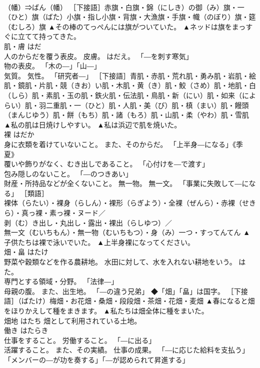 \documentclass[8pt]{extreport}
\begin{document}
\begin{CJK}{UTF8}{min}
\\	（幡）⇒ばん（幡） ［下接語］赤旗・白旗・錦（にしき）の御（み）旗・一（ひと）旗（ばた）小旗・指し小旗・背旗・大漁旗・手旗・幟（のぼり）旗・筵（むしろ）旗	▲その棒のてっぺんには旗がついていた。 ▲ネッドは旗をまっすぐに立てて持ってきた。
\\	肌・膚	はだ	
\\	人のからだを覆う表皮。 皮膚。 はだえ。 「―を刺す寒気」 
\\	物の表皮。 「木の―」「山―」 
\\	気質。 気性。 「研究者―」 ［下接語］青肌・赤肌・荒れ肌・勇み肌・岩肌・絵肌・鏡肌・片肌・競（きお）い肌・木肌・黄（き）肌・鮫（さめ）肌・地肌・白（しら）肌・素肌・玉の肌・鉄火肌・伝法肌・鳥肌・新（にい）肌・如来（によらい）肌・羽二重肌・一（ひと）肌・人肌・美（び）肌・槙（まい）肌・饅頭（まんじゆう）肌・餅（もち）肌・諸（もろ）肌・山肌・柔（やわ）肌・雪肌	▲私の肌は日焼けしやすい。 ▲私は浜辺で肌を焼いた。
\\	裸	はだか	
\\	身に衣類を着けていないこと。 また、そのからだ。 「上半身―になる」《季　夏》 
\\	覆いや飾りがなく、むき出しであること。 「心付けを―で渡す」 
\\	包み隠しのないこと。 「―のつきあい」 
\\	財産・所持品などが全くないこと。 無一物。 無一文。 「事業に失敗して―になる」 ［類語］
\\	裸体（らたい）・裸身（らしん）・裸形（らぎよう）・全裸（ぜんら）・赤裸（せきら）・真っ裸・素っ裸・ヌード／
\\	剥（む）き出し・丸出し・露出・裸出（らしゆつ）／
\\	無一文（むいちもん）・無一物（むいちもつ）・身（み）一つ・すってんてん	▲子供たちは裸で泳いでいた。 ▲上半身裸になってください。
\\	畑・畠	はたけ	
\\	野菜や穀類などを作る農耕地。 水田に対して、水を入れない耕地をいう。 はた。 
\\	専門とする領域・分野。 「法律―」 
\\	母親の腹。 また、出生地。 「―の違う兄弟」 ◆「畑」「畠」は国字。 ［下接語］（ばたけ）梅畑・お花畑・桑畑・段段畑・茶畑・花畑・麦畑	▲春になると畑をほりかえして種をまきます。 ▲私たちは畑全体に種をまいた。
\\	畑地	はたち	畑として利用されている土地。	
\\	働き	はたらき	
\\	仕事をすること。 労働すること。 「―に出る」 
\\	活躍すること。 また、その実績。 仕事の成果。 「―に応じた給料を支払う」「メンバーの―が功を奏する」「―が認められて昇進する」 

\end{CJK}
\end{document}
